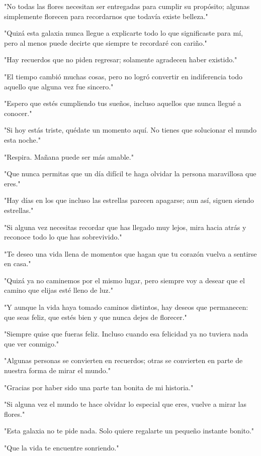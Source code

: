 "No todas las flores necesitan ser entregadas para cumplir su propósito; algunas simplemente florecen para recordarnos que todavía existe belleza."

"Quizá esta galaxia nunca llegue a explicarte todo lo que significaste para mí, pero al menos puede decirte que siempre te recordaré con cariño."

"Hay recuerdos que no piden regresar; solamente agradecen haber existido."

"El tiempo cambió muchas cosas, pero no logró convertir en indiferencia todo aquello que alguna vez fue sincero."

"Espero que estés cumpliendo tus sueños, incluso aquellos que nunca llegué a conocer."

"Si hoy estás triste, quédate un momento aquí. No tienes que solucionar el mundo esta noche."

"Respira. Mañana puede ser más amable."

"Que nunca permitas que un día difícil te haga olvidar la persona maravillosa que eres."

"Hay días en los que incluso las estrellas parecen apagarse; aun así, siguen siendo estrellas."

"Si alguna vez necesitas recordar que has llegado muy lejos, mira hacia atrás y reconoce todo lo que has sobrevivido."

"Te deseo una vida llena de momentos que hagan que tu corazón vuelva a sentirse en casa."

"Quizá ya no caminemos por el mismo lugar, pero siempre voy a desear que el camino que elijas esté lleno de luz."

"Y aunque la vida haya tomado caminos distintos, hay deseos que permanecen: que seas feliz, que estés bien y que nunca dejes de florecer."

"Siempre quise que fueras feliz. Incluso cuando esa felicidad ya no tuviera nada que ver conmigo."

"Algunas personas se convierten en recuerdos; otras se convierten en parte de nuestra forma de mirar el mundo."

"Gracias por haber sido una parte tan bonita de mi historia."

"Si alguna vez el mundo te hace olvidar lo especial que eres, vuelve a mirar las flores."

"Esta galaxia no te pide nada. Solo quiere regalarte un pequeño instante bonito."

"Que la vida te encuentre sonriendo."

